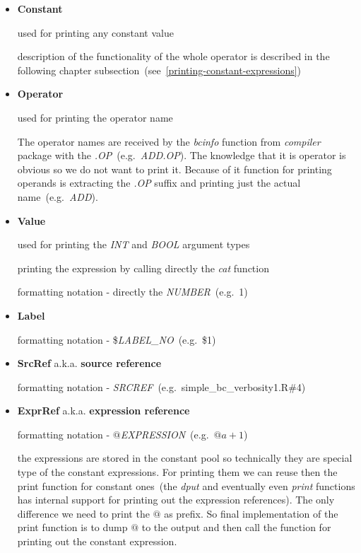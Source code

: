 \documentclass[thesis=M,english]{FITthesis}[2018/10/20]
\begin{document}
\begin{itemize}
	\item \textbf{Constant}
		
		used for printing any constant value
		
		description of the functionality of the whole operator is described in the following chapter subsection~(see~\ref{printing-constant-expressions})
		
	\item \textbf{Operator}
		
		used for printing the operator name
		
		The operator names are received by the \textit{bcinfo} function from \textit{compiler} package with the \textit{.OP}~(e.g.~\textit{ADD.OP}). The knowledge that it is operator is obvious so we do not want to print it. Because of it function for printing operands is extracting the \textit{.OP} suffix and printing just the actual name~(e.g.~\textit{ADD}).
		
	\item \textbf{Value}
	
		used for printing the \textit{INT} and \textit{BOOL} argument types
		
		printing the expression by calling directly the \textit{cat} function

	formatting notation - directly the \textit{NUMBER}~(e.g.~1)
		
	\item \textbf{Label}

	formatting notation - \$\textit{LABEL{\_}NO}~(e.g.~\$1)
	
	\item \textbf{SrcRef} a.k.a. \textbf{source reference}  
	
	formatting notation - \textit{SRCREF}~(e.g.~simple{\_}bc{\_}verbosity1.R{\#}4)
	 
	\item \textbf{ExprRef} a.k.a. \textbf{expression reference}
	
	formatting notation - $@$\textit{EXPRESSION}~(e.g.~$@a+1$)

	the expressions are stored in the constant pool so technically they are special type of the constant expressions. For printing them we can reuse then the print function for constant ones~(the \textit{dput} and eventually even \textit{print} functions has internal support for printing out the expression references). The only difference we need to print the $@$ as prefix. So final implementation of the print function is to dump $@$ to the output and then call the function for printing out the constant expression.
	
\end{itemize}
\end{document}
